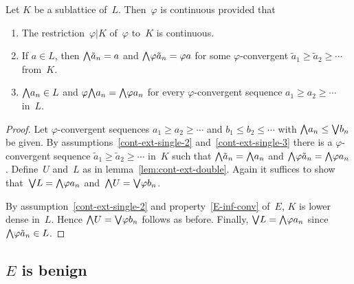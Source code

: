 \documentclass[main.tex]{subfiles}
\begin{document}
\begin{lem}
\label{lem:cont-ext-single}
Let $K$ be a sublattice of~$L$.
Then~$\varphi$ is continuous provided that
\begin{enumerate}
\item
\label{cont-ext-single-1}
The restriction~$\varphi|K$
of~$\varphi$ to~$K$ is continuous.

\item
\label{cont-ext-single-2}
If $a\in L$,
then
$\textstyle{\bigwedge}\tilde a_n = a$ and $\textstyle{\bigwedge} \varphi \tilde a_n = \varphi a$
for some $\varphi$-convergent $\tilde a_1 \geq \tilde a_2 \geq \dotsb$
from~$K$.

\item
\label{cont-ext-single-3}
$\textstyle{\bigwedge} a_n \in L$ and $\varphi \textstyle{\bigwedge} a_n = \textstyle{\bigwedge} \varphi a_n$
for every $\varphi$-convergent sequence $a_1 \geq a_2 \geq \dotsb$
in~$L$.
\end{enumerate}
\end{lem}
\begin{proof}
Let $\varphi$-convergent sequences
$a_1 \geq a_2 \geq \dotsb$
and $b_1 \leq b_2 \leq \dotsb$
with $\textstyle{\bigwedge} a_n \leq \textstyle{\bigvee} b_n$ be given.
By assumptions~\ref{cont-ext-single-2} and~\ref{cont-ext-single-3}
there is a $\varphi$-convergent sequence 
$\tilde a_1 \geq \tilde a_2 \geq \dotsb$ in~$K$
such that $\textstyle{\bigwedge} \tilde a_n = \textstyle{\bigwedge} a_n$
and $\textstyle{\bigwedge}\varphi\tilde a_n = \textstyle{\bigwedge}\varphi a_n$.
Define~$U$ and~$L$ as in lemma~\ref{lem:cont-ext-double}.
Again it suffices to show that~$\textstyle{\bigvee} L = \textstyle{\bigwedge} \varphi a_n$
and~$\textstyle{\bigwedge} U = \textstyle{\bigvee} \varphi b_n$.

By assumption~\ref{cont-ext-single-2}
and property~\ref{E-inf-conv} of~$E$,
$K$ is lower dense in~$L$.
Hence $\textstyle{\bigwedge} U = \textstyle{\bigvee} \varphi b_n$ follows as before.
Finally, $\textstyle{\bigvee} L = \textstyle{\bigwedge} \varphi a_n$  since $\textstyle{\bigwedge} \varphi \tilde a_n \in L$.
\end{proof}

\subsection{$E$ is benign}
\label{SS:fitting-benign}
\end{document}
